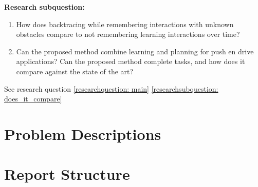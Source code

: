 \textbf{Research subquestion:}
\begin{enumerate}
    \item \label{researchsubquestion: does_it_work} How does backtracing \cite{krontiris_dealing_2015} while remembering interactions with unknown obstacles compare to not remembering learning interactions over time?
    \item\label{researchsubquestion: does_it_compare} Can the proposed method combine learning and planning for push en drive applications? Can the proposed method complete tasks, and how does it compare against the state of the art? 
\end{enumerate}

See research question \ref{researchquestion: main}
\cref{researchsubquestion: does_it_compare}

\section{Problem Descriptions}
\section{Report Structure}